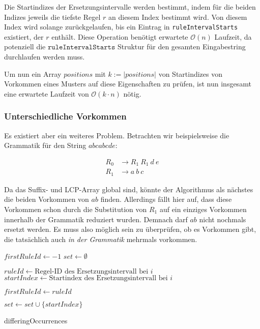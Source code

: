 Die Startindizes der Ersetzungsintervalle werden bestimmt, indem für die beiden Indizes jeweils die tiefste Regel $r$ an diesem Index bestimmt wird. Von diesem Index wird solange zurückgelaufen, bis ein Eintrag in \texttt{ruleIntervalStarts} existiert, der $r$ enthält. Diese Operation benötigt erwartete $\mathcal{O}(n)$ Laufzeit, da potenziell die $\texttt{ruleIntervalStarts}$ Struktur für den gesamten Eingabestring durchlaufen werden muss.

Um nun ein Array $positions$ mit $k := |positions|$ von Startindizes von Vorkommen eines Musters auf diese Eigenschaften zu prüfen, ist nun insgesamt eine erwartete Laufzeit von $\mathcal{O}(k \cdot n)$ nötig.

\subsubsection{Unterschiedliche Vorkommen}

Es existiert aber ein weiteres Problem. Betrachten wir beispielsweise die Grammatik für den String $abcabcde$:

\begin{align*}
	R_0 &\rightarrow R_1\ R_1\ d\ e\\
	R_1 &\rightarrow a\ b\ c
\end{align*}

Da das Suffix- und LCP-Array global sind, könnte der Algorithmus als nächstes die beiden Vorkommen von $ab$ finden. 
Allerdings fällt hier auf, dass diese Vorkommen schon durch die Substitution von $R_1$ auf ein einziges Vorkommen innerhalb der Grammatik reduziert wurden. Demnach darf $ab$ nicht nochmals ersetzt werden. 
Es muss also möglich sein zu überprüfen, ob es Vorkommen gibt, die tatsächlich auch \emph{in der Grammatik} mehrmals vorkommen.
\begin{algorithm}[t]
    $firstRuleId \leftarrow -1$\;
    $set \leftarrow \emptyset$\;
     {
        $ruleId \leftarrow \text{Regel-ID des Ersetzungsintervall bei } i$\;
        $startIndex \leftarrow \text{Startindex des Ersetzungsintervall bei } i$\;
        
         {
            $firstRuleId \leftarrow ruleId$\;
        }
         {
            \;
        }
            
        $set \leftarrow set \cup \{startIndex\}$\;
    }
    \;
    \caption{differingOccurrences}
    \label{diffOccAlgoV2}
\end{algorithm}

